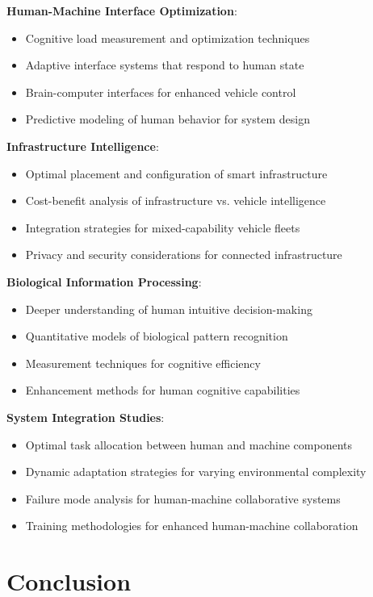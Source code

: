 \documentclass[12pt,a4paper]{article}
\begin{document}
\textbf{Human-Machine Interface Optimization}:
\begin{itemize}
\item Cognitive load measurement and optimization techniques
\item Adaptive interface systems that respond to human state
\item Brain-computer interfaces for enhanced vehicle control
\item Predictive modeling of human behavior for system design
\end{itemize}

\textbf{Infrastructure Intelligence}:
\begin{itemize}
\item Optimal placement and configuration of smart infrastructure
\item Cost-benefit analysis of infrastructure vs. vehicle intelligence
\item Integration strategies for mixed-capability vehicle fleets
\item Privacy and security considerations for connected infrastructure
\end{itemize}

\textbf{Biological Information Processing}:
\begin{itemize}
\item Deeper understanding of human intuitive decision-making
\item Quantitative models of biological pattern recognition
\item Measurement techniques for cognitive efficiency
\item Enhancement methods for human cognitive capabilities
\end{itemize}

\textbf{System Integration Studies}:
\begin{itemize}
\item Optimal task allocation between human and machine components
\item Dynamic adaptation strategies for varying environmental complexity
\item Failure mode analysis for human-machine collaborative systems
\item Training methodologies for enhanced human-machine collaboration
\end{itemize}

\section{Conclusion}
\end{document}
